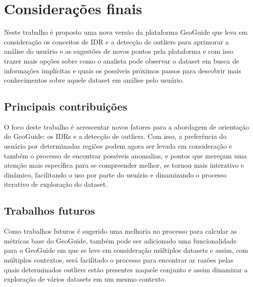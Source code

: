 \chapter{Considerações finais}
\label{chap:consideracoes}



Neste trabalho é proposto uma nova versão da plataforma GeoGuide \cite{omidvarTehrani2017} que leva em consideração os conceitos de IDR e a detecção de outliers para aprimorar a análise do usuário e as sugestões de novos pontos pela plataforma e com isso trazer mais opções sobre como o analista pode observar o dataset em busca de informações implícitas e quais os possíveis próximos passos para descobrir mais conhecimentos sobre aquele dataset em análise pelo usuário.

\section{Principais contribuições}

O foco deste trabalho é acrescentar novos fatores para a abordagem de orientação do GeoGuide: os IDRs e a detecção de outliers. Com isso, a preferência do usuário por determinadas regiões podem agora ser levada em consideração e também o processo de encontrar possíveis anomalias, e pontos que mereçam uma atenção mais específica para se compreender melhor, se tornou mais interativo e dinâmico, facilitando o uso por parte do usuário e dinamizando o processo iterativo de exploração do dataset.

\section{Trabalhos futuros}

Como trabalhos futuros é sugerido uma melhoria no processo para calcular as métricas base do GeoGuide, também pode ser adicionado uma funcionalidade para o GeoGuide em que se leve em consideração múltiplos datasets e assim, com múltiplos contextos, será facilitado o processo para encontrar as razões pelas quais determinados outliers estão presentes naquele conjunto e assim dinamizar a exploração de vários datasets em um mesmo contexto. 